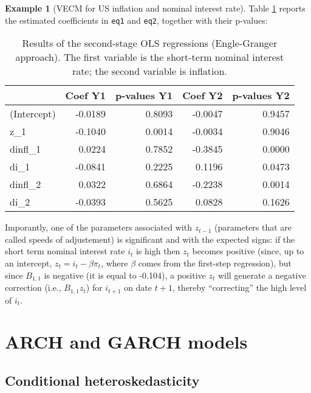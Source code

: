 \documentclass[
  12pt,
]{book}
\theoremstyle{definition}
\theoremstyle{definition}
\newtheorem{example}{Example}[chapter]
\theoremstyle{definition}
\theoremstyle{definition}
\theoremstyle{remark}
\begin{document}
\begin{example}[VECM for US inflation and nominal interest rate]
Table \ref{tab:EngleGrangerUS3} reports the estimated coefficients in \texttt{eq1} and \texttt{eq2}, together with their p-values:

\begin{table}

\caption{\label{tab:EngleGrangerUS3}Results of the second-stage OLS regressions (Engle-Granger approach). The first variable is the short-term nominal interest rate; the second variable is inflation.}
\centering
\begin{tabular}[t]{l|r|r|r|r}
\hline
  & Coef Y1 & p-values Y1 & Coef Y2 & p-values Y2\\
\hline
(Intercept) & -0.0189 & 0.8093 & -0.0047 & 0.9457\\
\hline
z\_1 & -0.1040 & 0.0014 & -0.0034 & 0.9046\\
\hline
dinfl\_1 & 0.0224 & 0.7852 & -0.3845 & 0.0000\\
\hline
di\_1 & -0.0841 & 0.2225 & 0.1196 & 0.0473\\
\hline
dinfl\_2 & 0.0322 & 0.6864 & -0.2238 & 0.0014\\
\hline
di\_2 & -0.0393 & 0.5625 & 0.0828 & 0.1626\\
\hline
\end{tabular}
\end{table}

Imporantly, one of the parameters associated with \(z_{t-1}\) (parameters that are called speeds of adjustement) is significant and with the expected signs: if the short term nominal interest rate \(i_t\) is high then \(z_t\) becomes positive (since, up to an intercept, \(z_t = i_t - \beta \pi_t\), where \(\beta\) comes from the first-step regression), but since \(B_{1,1}\) is negative (it is equal to -0.104), a positive \(z_t\) will generate a negative correction (i.e., \(B_{1,1}z_t\)) for \(i_{t+1}\) on date \(t+1\), thereby ``correcting'' the high level of \(i_t\).
\end{example}

\hypertarget{ARCHGARCH}{%
\chapter{ARCH and GARCH models}\label{ARCHGARCH}}

\hypertarget{conditional-heteroskedasticity}{%
\section{Conditional heteroskedasticity}\label{conditional-heteroskedasticity}}
\end{document}
